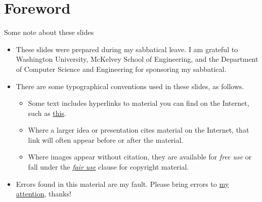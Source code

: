 
\section{Foreword}
\begin{frame}{Some note about these slides}
\begin{itemize}
    \item These slides were prepared during my sabbatical leave.  I am grateful to Washington University, McKelvey School of Engineering, and the Department of Computer Science and Engineering for sponsoring my sabbatical.
    \item There are some typographical conventions used in these slides, as follows.
    \begin{itemize}
        \item Some text includes hyperlinks to material you can find on the Internet, such as \href{https://en.wikipedia.org/wiki/Hyperlink}{this}.
        \item Where a larger idea or presentation cites material on the Internet, that link will often appear before or after the material. 
        \item Where images appear without citation, they are available for \emph{free use} or fall under the \href{https://en.wikipedia.org/wiki/Fair_use}{\emph{fair use}} clause for copyright material. 
    \end{itemize}
    \item Errors found in this material are my fault.  Please bring errors to \href{mailto:cytron@wustl.edu}{my attention}, thanks!
\end{itemize}
\end{frame}
